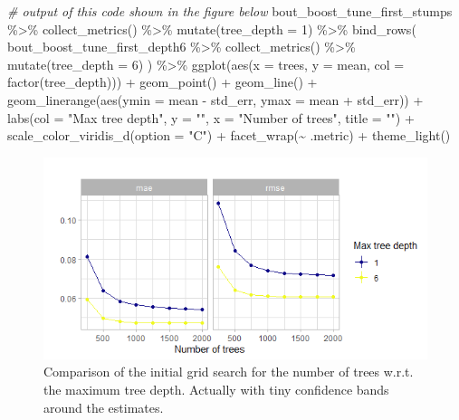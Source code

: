 \documentclass[
]{book}
\newenvironment{Shaded}{\begin{snugshade}}{\end{snugshade}}
\newcommand{\AttributeTok}[1]{\textcolor[rgb]{0.77,0.63,0.00}{#1}}
\newcommand{\CommentTok}[1]{\textcolor[rgb]{0.56,0.35,0.01}{\textit{#1}}}
\newcommand{\DecValTok}[1]{\textcolor[rgb]{0.00,0.00,0.81}{#1}}
\newcommand{\FunctionTok}[1]{\textcolor[rgb]{0.00,0.00,0.00}{#1}}
\newcommand{\NormalTok}[1]{#1}
\newcommand{\SpecialCharTok}[1]{\textcolor[rgb]{0.00,0.00,0.00}{#1}}
\newcommand{\StringTok}[1]{\textcolor[rgb]{0.31,0.60,0.02}{#1}}
\begin{document}
\begin{Shaded}
\begin{Highlighting}[]
\CommentTok{\# output of this code shown in the figure below}
\NormalTok{bout\_boost\_tune\_first\_stumps }\SpecialCharTok{\%\textgreater{}\%}
  \FunctionTok{collect\_metrics}\NormalTok{() }\SpecialCharTok{\%\textgreater{}\%}
  \FunctionTok{mutate}\NormalTok{(}\AttributeTok{tree\_depth =} \DecValTok{1}\NormalTok{) }\SpecialCharTok{\%\textgreater{}\%}
  \FunctionTok{bind\_rows}\NormalTok{(}
\NormalTok{    bout\_boost\_tune\_first\_depth6 }\SpecialCharTok{\%\textgreater{}\%}
      \FunctionTok{collect\_metrics}\NormalTok{() }\SpecialCharTok{\%\textgreater{}\%}
      \FunctionTok{mutate}\NormalTok{(}\AttributeTok{tree\_depth =} \DecValTok{6}\NormalTok{)}
\NormalTok{  ) }\SpecialCharTok{\%\textgreater{}\%}
  \FunctionTok{ggplot}\NormalTok{(}\FunctionTok{aes}\NormalTok{(}\AttributeTok{x =}\NormalTok{ trees, }\AttributeTok{y =}\NormalTok{ mean, }\AttributeTok{col =} \FunctionTok{factor}\NormalTok{(tree\_depth))) }\SpecialCharTok{+}
  \FunctionTok{geom\_point}\NormalTok{() }\SpecialCharTok{+}
  \FunctionTok{geom\_line}\NormalTok{() }\SpecialCharTok{+}
  \FunctionTok{geom\_linerange}\NormalTok{(}\FunctionTok{aes}\NormalTok{(}\AttributeTok{ymin =}\NormalTok{ mean }\SpecialCharTok{{-}}\NormalTok{ std\_err, }\AttributeTok{ymax =}\NormalTok{ mean }\SpecialCharTok{+}\NormalTok{ std\_err)) }\SpecialCharTok{+}
  \FunctionTok{labs}\NormalTok{(}\AttributeTok{col =} \StringTok{"Max tree depth"}\NormalTok{, }\AttributeTok{y =} \StringTok{""}\NormalTok{, }\AttributeTok{x =} \StringTok{"Number of trees"}\NormalTok{,}
       \AttributeTok{title =} \StringTok{""}\NormalTok{) }\SpecialCharTok{+}
  \FunctionTok{scale\_color\_viridis\_d}\NormalTok{(}\AttributeTok{option =} \StringTok{"C"}\NormalTok{) }\SpecialCharTok{+}
  \FunctionTok{facet\_wrap}\NormalTok{(}\SpecialCharTok{\textasciitilde{}}\NormalTok{ .metric) }\SpecialCharTok{+}
  \FunctionTok{theme\_light}\NormalTok{()}
\end{Highlighting}
\end{Shaded}

\begin{figure}

{\centering \includegraphics[width=0.7\linewidth]{_pictures/bout_tuning_stumpsVs6} 

}

\caption{Comparison of the initial grid search for the number of trees w.r.t. the maximum tree depth. Actually with tiny confidence bands around the estimates.}\label{fig:bouttuningstumpsVs6}
\end{figure}
\end{document}
